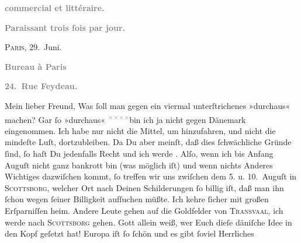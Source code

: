 \begin{ledgroupsized}[t]{13cm}
           \pstart
           \begin{otherlanguage}{french}\textcolor{gray}{\textbf{commercial et littéraire.}}\end{otherlanguage}\pend
           \pstart
           \begin{otherlanguage}{french}\textcolor{gray}{\textbf{\textbf{Paraissant trois fois par jour.}}}\end{otherlanguage}\hfill \textsc{Paris}, 29. Juni.\pend
           \pstart
           \begin{otherlanguage}{french}\textcolor{gray}{\textbf{\textbf{Bureau à Paris}}}\end{otherlanguage}\pend
           \pstart
           \begin{otherlanguage}{french}\textcolor{gray}{\textbf{\textbf{24. Rue Feydeau.}}}\end{otherlanguage}\pend
           \pstart\center{}Mein lieber Freund,\pend\pstart
           Was ſoll man gegen ein viermal unterſtrichenes »durchaus« machen? Gar ſo »durchaus« \substVorne{}\textsuperscript{\textcolor{gray}{×}\-\textcolor{gray}{×}\-\textcolor{gray}{×}\-\textcolor{gray}{×}}\substDazwischen{}bin\substHinten{} ich ja nicht gegen Dänemark
               eingenommen. Ich habe nur nicht die Mittel, um hinzufahren, und nicht die mindeſte
               Luſt, dortzubleiben. Da Du aber meinſt, daß dies ſchwächliche Gründe ſind, ſo haſt Du
               jedenfalls Recht und ich werde \label{K_L02779-1v}\label{K_L02779-1h}. Alſo, wenn ich bis Anfang {\pb}Auguſt nicht ganz bankrott bin (was möglich iſt) und wenn
               nichts Anderes Wichtiges dazwiſchen kommt, ſo treffen wir uns zwiſchen dem 5. u. 10. Auguſt in \textsc{Scottsborg}, welcher Ort nach Deinen
               Schilderungen ſo billig iſt, daß man ihn ſchon wegen ſeiner Billigkeit aufſuchen
               müßte. Ich kehre ſicher mit großen Erſparniſſen heim. Andere Leute gehen auf die
               Goldfelder von \textsc{Transvaal}, ich werde nach \textsc{Scottsborg} gehen. Gott allein weiß, wer Euch dieſe däniſche Idee in den Kopf geſetzt hat! {\pb}Europa iſt ſo ſchön und es gibt ſoviel Herrliches

\end{ledgroupsized}
